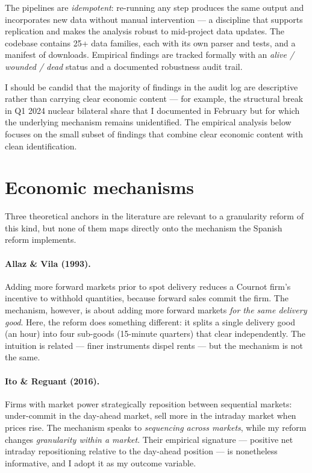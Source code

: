 \documentclass[11pt,a4paper]{article}
\begin{document}
The pipelines are \emph{idempotent}: re-running any step produces the same output and incorporates new data without manual intervention --- a discipline that supports replication and makes the analysis robust to mid-project data updates. The codebase contains 25+ data families, each with its own parser and tests, and a manifest of downloads. Empirical findings are tracked formally with an \emph{alive / wounded / dead} status and a documented robustness audit trail.

I should be candid that the majority of findings in the audit log are descriptive rather than carrying clear economic content --- for example, the structural break in Q1 2024 nuclear bilateral share that I documented in February but for which the underlying mechanism remains unidentified. The empirical analysis below focuses on the small subset of findings that combine clear economic content with clean identification.

\section{Economic mechanisms}\label{sec:mechanism}

Three theoretical anchors in the literature are relevant to a granularity reform of this kind, but none of them maps directly onto the mechanism the Spanish reform implements.

\paragraph{Allaz \& Vila (1993).} Adding more forward markets prior to spot delivery reduces a Cournot firm's incentive to withhold quantities, because forward sales commit the firm. The \citet{AllazVila1993} mechanism, however, is about adding more forward markets \emph{for the same delivery good}. Here, the reform does something different: it splits a single delivery good (an hour) into four sub-goods (15-minute quarters) that clear independently. The intuition is related --- finer instruments dispel rents --- but the mechanism is not the same.

\paragraph{Ito \& Reguant (2016).} Firms with market power strategically reposition between sequential markets: under-commit in the day-ahead market, sell more in the intraday market when prices rise. The \citet{ItoReguant2016} mechanism speaks to \emph{sequencing across markets}, while my reform changes \emph{granularity within a market}. Their empirical signature --- positive net intraday repositioning relative to the day-ahead position --- is nonetheless informative, and I adopt it as my outcome variable.
\end{document}
